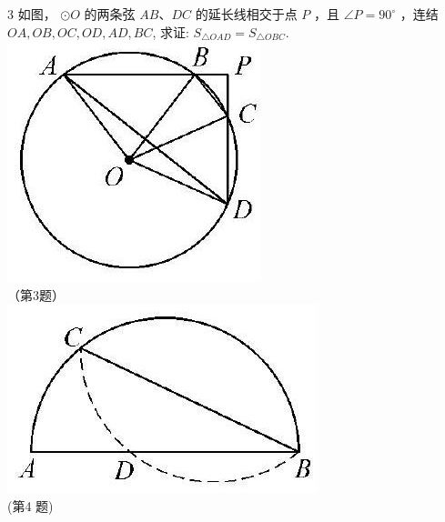 \documentclass[10pt]{article}
\begin{document}
3 如图， $\odot O$ 的两条弦 $A B 、 D C$ 的延长线相交于点 $P$ ，且 $\angle P=90^{\circ}$ ，连结 $O A, O B, O C, O D, A D, B C$, 求证: $S_{\triangle O A D}=S_{\triangle O B C}$.\\
\includegraphics[max width=\textwidth, center]{2024_10_30_66b8e5e701da2093c133g-027(4)}\\
（第3题）\\
\includegraphics[max width=\textwidth, center]{2024_10_30_66b8e5e701da2093c133g-027(1)}\\
(第4 题)
\end{document}
